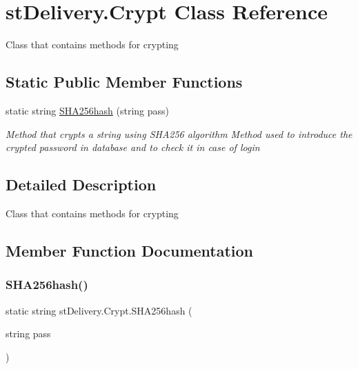 \hypertarget{classst_delivery_1_1_crypt}{}\section{st\+Delivery.\+Crypt Class Reference}
\label{classst_delivery_1_1_crypt}


Class that contains methods for crypting  


\subsection*{Static Public Member Functions}
\begin{DoxyCompactItemize}
\item 
static string \hyperlink{classst_delivery_1_1_crypt_a3be7180ab33c535de53925b008f3efb0}{S\+H\+A256hash} (string pass)
\begin{DoxyCompactList}\small\item\em Method that crypts a string using S\+H\+A256 algorithm Method used to introduce the crypted password in database and to check it in case of login \end{DoxyCompactList}\end{DoxyCompactItemize}


\subsection{Detailed Description}
Class that contains methods for crypting 



\subsection{Member Function Documentation}
\mbox{\label{classst_delivery_1_1_crypt_a3be7180ab33c535de53925b008f3efb0}} 
\subsubsection{\texorpdfstring{S\+H\+A256hash()}{SHA256hash()}}
{\footnotesize\ttfamily static string st\+Delivery.\+Crypt.\+S\+H\+A256hash (\begin{DoxyParamCaption}\item[{string}]{pass }\end{DoxyParamCaption})\hspace{0.3cm}{\ttfamily [static]}}



